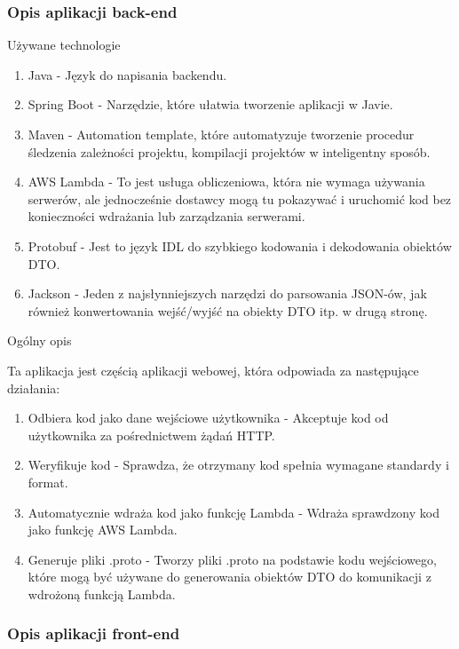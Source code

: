\documentclass[runningheads,12pt]{llncs}
\begin{document}
\subsubsection{Opis aplikacji back-end}

Używane technologie

\begin{enumerate}
    \item Java - Język do napisania backendu.
    \item Spring Boot - Narzędzie, które ułatwia tworzenie aplikacji w Javie.
    \item Maven - Automation template, które automatyzuje tworzenie procedur śledzenia zależności projektu, kompilacji projektów w inteligentny sposób.
    \item AWS Lambda - To jest usługa obliczeniowa, która nie wymaga używania serwerów, ale jednocześnie dostawcy mogą tu pokazywać i uruchomić kod bez konieczności wdrażania lub zarządzania serwerami.
    \item Protobuf - Jest to język IDL do szybkiego kodowania i dekodowania obiektów DTO.
    \item Jackson - Jeden z najsłynniejszych narzędzi do parsowania JSON-ów, jak również konwertowania wejść/wyjść na obiekty DTO itp. w drugą stronę.
\end{enumerate}

Ogólny opis

Ta aplikacja jest częścią aplikacji webowej, która odpowiada za następujące działania:
\begin{enumerate}
    \item Odbiera kod jako dane wejściowe użytkownika - Akceptuje kod od użytkownika za pośrednictwem żądań HTTP.
    \item Weryfikuje kod - Sprawdza, że otrzymany kod spełnia wymagane standardy i format.
    \item Automatycznie wdraża kod jako funkcję Lambda -  Wdraża sprawdzony kod jako funkcję AWS Lambda.
    \item Generuje pliki .proto - Tworzy pliki .proto na podstawie kodu wejściowego, które mogą być używane do generowania obiektów DTO do komunikacji z wdrożoną funkcją Lambda.
\end{enumerate}


\subsubsection{Opis aplikacji front-end}
\end{document}
